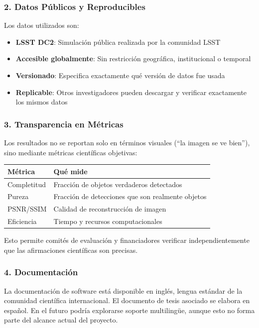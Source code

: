 \subsubsection{2. Datos Públicos y Reproducibles}

Los datos utilizados son:

\begin{itemize}
    \item \textbf{LSST DC2}: Simulación pública realizada por la comunidad LSST
    \item \textbf{Accesible globalmente}: Sin restricción geográfica, institucional o temporal
    \item \textbf{Versionado}: Especifica exactamente qué versión de datos fue usada
    \item \textbf{Replicable}: Otros investigadores pueden descargar y verificar exactamente los mismos datos
\end{itemize}

\subsubsection{3. Transparencia en Métricas}

Los resultados no se reportan solo en términos visuales (``la imagen se ve bien''), sino mediante métricas científicas objetivas:

\begin{table}[H]
\centering
\small
\begin{tabular}{|p{4cm}|p{4cm}|}
\hline
\textbf{Métrica} & \textbf{Qué mide} \\
\hline
Completitud & Fracción de objetos verdaderos detectados \\
Pureza & Fracción de detecciones que son realmente objetos \\
PSNR/SSIM & Calidad de reconstrucción de imagen \\
Eficiencia & Tiempo y recursos computacionales \\
\hline
\end{tabular}
\end{table}

Esto permite comités de evaluación y financiadores verificar independientemente que las afirmaciones científicas son precisas.

\subsubsection{4. Documentación}

La documentación de software está disponible en inglés, lengua estándar de la comunidad científica internacional. El documento de tesis asociado se elabora en español. En el futuro podría explorarse soporte multilingüe, aunque esto no forma parte del alcance actual del proyecto.

